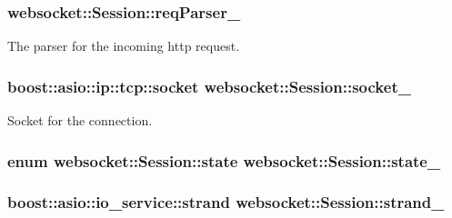 \subsubsection[{\texorpdfstring{req\+Parser\+\_\+}{reqParser_}}]{ websocket\+::\+Session\+::req\+Parser\+\_\+\hspace{0.3cm}{\ttfamily [private]}}\hypertarget{classwebsocket_1_1Session_a0336ca414e7c038331b39a01cdb23da8}{}\label{classwebsocket_1_1Session_a0336ca414e7c038331b39a01cdb23da8}


The parser for the incoming http request. 

\subsubsection[{\texorpdfstring{socket\+\_\+}{socket_}}]{\setlength{\rightskip}{0pt plus 5cm}boost\+::asio\+::ip\+::tcp\+::socket websocket\+::\+Session\+::socket\+\_\+\hspace{0.3cm}{\ttfamily [private]}}\hypertarget{classwebsocket_1_1Session_a7e7771fef3f105f4019ef9a1c2f04eb5}{}\label{classwebsocket_1_1Session_a7e7771fef3f105f4019ef9a1c2f04eb5}


Socket for the connection. 

\subsubsection[{\texorpdfstring{state\+\_\+}{state_}}]{\setlength{\rightskip}{0pt plus 5cm}enum {\bf websocket\+::\+Session\+::state}  websocket\+::\+Session\+::state\+\_\+}\hypertarget{classwebsocket_1_1Session_a8f9e0d65f4de675dd7b8242e17ee29b7}{}\label{classwebsocket_1_1Session_a8f9e0d65f4de675dd7b8242e17ee29b7}
\subsubsection[{\texorpdfstring{strand\+\_\+}{strand_}}]{\setlength{\rightskip}{0pt plus 5cm}boost\+::asio\+::io\+\_\+service\+::strand websocket\+::\+Session\+::strand\+\_\+\hspace{0.3cm}{\ttfamily [private]}}\hypertarget{classwebsocket_1_1Session_a394bb9b578c166e22b2a630b8ea013fb}{}\label{classwebsocket_1_1Session_a394bb9b578c166e22b2a630b8ea013fb}


